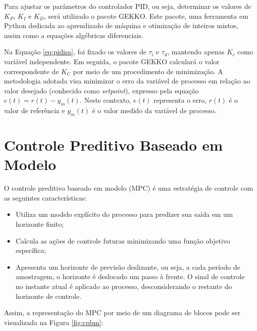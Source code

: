 \documentclass[12pt,           %
a4paper,                       %
openany,                       %
oneside,                       %
chapter=TITLE,                 %
english,                       %
spanish,                       %
brazil,                        %
sumario=tradicional]{abntex2}  %
\begin{document}
\begin{OnehalfSpace}
Para ajustar os parâmetros do controlador PID, ou seja, determinar os valores de $K_P$, $K_I$ e $K_D$, será utilizado o pacote GEKKO\cite{gekko}. Este pacote, uma ferramenta em Python dedicada ao aprendizado de máquina e otimização de inteiros mistos, assim como a equações algébricas diferenciais.

Na Equação \ref{eq:pidisa}, foi fixado os valores de $\tau_i$ e $\tau_d$, mantendo apenas $K_c$ como variável independente. Em seguida, o pacote GEKKO calculará o valor correspondente de $K_C$ por meio de um procedimento de minimização. A metodologia adotada visa minimizar o erro da variável de processo em relação ao valor desejado (conhecido como \textit{setpoint}), expresso pela equação $e(t) = r(t) - y_m(t)$. Neste contexto, $e(t)$ representa o erro, $r(t)$ é o valor de referência e $y_m(t)$ é o valor medido da variável de processo.

\section{Controle Preditivo Baseado em Modelo}
\label{Controle Preditivo Baseado em Modelo}

O controle preditivo baseado em modelo (MPC) é uma estratégia de controle com as seguintes características:

\begin{itemize}
    \item Utiliza um modelo explícito do processo para predizer sua saída em um horizonte finito;
    \item Calcula as ações de controle futuras minimizando uma função objetivo específica;
    \item Apresenta um horizonte de previsão deslizante, ou seja, a cada período de amostragem, o horizonte é deslocado um passo à frente. O sinal de controle no instante atual é aplicado ao processo, desconsiderando o restante do horizonte de controle.
\end{itemize}

Assim, a representação do MPC por meio de um diagrama de blocos pode ser visualizada na Figura \ref{fig:cpbm}:


\end{OnehalfSpace}
\end{document}
